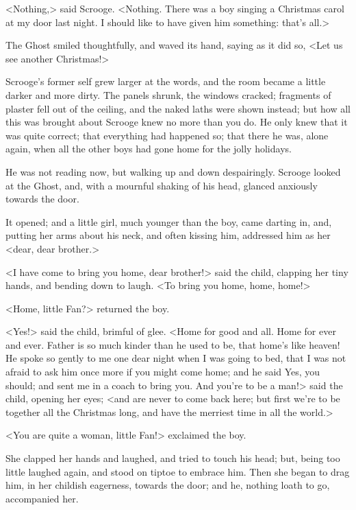 <Nothing,> said Scrooge. <Nothing. There was a boy singing a Christmas carol at
my door last night. I should like to have given him something: that's all.>

The Ghost smiled thoughtfully, and waved its hand, saying as it did so, <Let us
see another Christmas!>

Scrooge's former self grew larger at the words, and the room became a little
darker and more dirty. The panels shrunk, the windows cracked; fragments of
plaster fell out of the ceiling, and the naked laths were shown instead; but how
all this was brought about Scrooge knew no more than you do. He only knew that
it was quite correct; that everything had happened so; that there he was, alone
again, when all the other boys had gone home for the jolly holidays.

He was not reading now, but walking up and down despairingly. Scrooge looked at
the Ghost, and, with a mournful shaking of his head, glanced anxiously towards
the door.

It opened; and a little girl, much younger than the boy, came darting in, and,
putting her arms about his neck, and often kissing him, addressed him as her
<dear, dear brother.>

<I have come to bring you home, dear brother!> said the child, clapping her tiny
hands, and bending down to laugh. <To bring you home, home, home!>

<Home, little Fan?> returned the boy.

<Yes!> said the child, brimful of glee. <Home for good and all. Home for ever
and ever. Father is so much kinder than he used to be, that home's like heaven!
He spoke so gently to me one dear night when I was going to bed, that I was not
afraid to ask him once more if you might come home; and he said Yes, you should;
and sent me in a coach to bring you. And you're to be a man!> said the child,
opening her eyes; <and are never to come back here; but first we're to be
together all the Christmas long, and have the merriest time in all the world.>

<You are quite a woman, little Fan!> exclaimed the boy.

She clapped her hands and laughed, and tried to touch his head; but, being too
little laughed again, and stood on tiptoe to embrace him. Then she began to drag
him, in her childish eagerness, towards the door; and he, nothing loath to go,
accompanied her.

